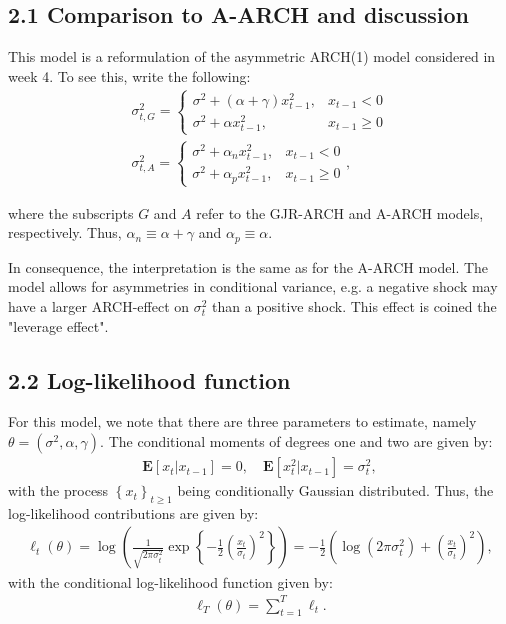 \documentclass[11pt,a4paper,oneside]{article}
\newcommand{\lp}{\left(}
\newcommand{\rp}{\right)}
\newcommand{\rb}{\right]}
\newcommand{\lb}{\left[}
\newcommand{\lc}{\left\{}
\newcommand{\rc}{\right\}}
\newcommand{\ee}{\mathbf{E}}
\newcommand{\sumt}{\sum_{t=1}^T}
\begin{document}
\subsection{2.1 Comparison to A-ARCH and discussion}
This model is a reformulation of the asymmetric ARCH(1) model considered in week 4. To see this, write the following:
\begin{align}
    \sigma_{t, G}^2 = 
        \begin{cases}
            \sigma^2 + \lp \alpha + \gamma \rp x_{t-1}^2, & x_{t-1} < 0\\
            \sigma^2 + \alpha x_{t-1}^2, & x_{t-1} \geq 0
        \end{cases}\\
    \sigma_{t, A}^2 = 
        \begin{cases}
            \sigma^2 + \alpha_n x_{t-1}^2, & x_{t-1} < 0\\
            \sigma^2 + \alpha_p x_{t-1}^2, & x_{t-1} \geq 0
        \end{cases},
\end{align}

where the subscripts $G$ and $A$ refer to the GJR-ARCH and A-ARCH models, respectively. Thus, $\alpha_n \equiv \alpha + \gamma$ and $\alpha_p \equiv \alpha$.

In consequence, the interpretation is the same as for the A-ARCH model. The model allows for asymmetries in conditional variance, e.g. a negative shock may have a larger ARCH-effect on $\sigma_t^2$ than a positive shock. This effect is coined the "leverage effect".

\subsection{2.2 Log-likelihood function}
For this model, we note that there are three parameters to estimate, namely $\theta = \lp \sigma^2, \alpha, \gamma\rp$. The conditional moments of degrees one and two are given by:
\begin{gather}
    \ee\lb x_t \vert x_{t-1}\rb = 0, \quad \ee\lb x_t^2\vert x_{t-1}\rb = \sigma_t^2,
\end{gather}
with the process $\lc x_t\rc_{t\geq 1}$ being conditionally Gaussian distributed. Thus, the log-likelihood contributions are given by:
\begin{align}
    \ell_t\lp \theta\rp = \log\lp \frac{1}{\sqrt{2\pi\sigma_t^2}}\exp\lc - \frac{1}{2}\lp \frac{x_t}{\sigma_t}\rp^2\rc\rp = - \frac{1}{2}\lp \log\lp 2 \pi \sigma_t^2\rp + \lp\frac{x_t}{\sigma_t}\rp^2\rp,
\end{align}
with the conditional log-likelihood function given by:
\begin{align}
    \ell_T\lp \theta\rp = \sumt \ell_t.
\end{align}
\end{document}
